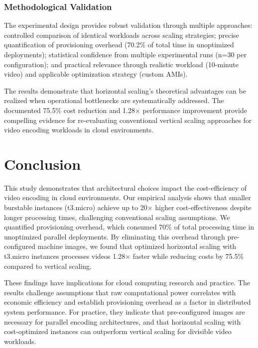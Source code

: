 \documentclass[conference]{IEEEtran}
\begin{document}
	\subsubsection{Methodological Validation}
	
	The experimental design provides robust validation through multiple approaches: controlled comparison of identical workloads across scaling strategies; precise quantification of provisioning overhead (70.2\% of total time in unoptimized deployments); statistical confidence from multiple experimental runs (n=30 per configuration); and practical relevance through realistic workload (10-minute video) and applicable optimization strategy (custom AMIs).
	
	The results demonstrate that horizontal scaling's theoretical advantages can be realized when operational bottlenecks are systematically addressed. The documented 75.5\% cost reduction and 1.28× performance improvement provide compelling evidence for re-evaluating conventional vertical scaling approaches for video encoding workloads in cloud environments.
	
	
	
	
	
	
	
	
	
	
	
	
	
	
	
	
	
	
	\section{Conclusion}
	\label{conclusion}
	
	This study demonstrates that architectural choices impact the cost-efficiency of video encoding in cloud environments. Our empirical analysis shows that smaller burstable instances (t3.micro) achieve up to 20× higher cost-effectiveness despite longer processing times, challenging conventional scaling assumptions. We quantified provisioning overhead, which consumed 70\% of total processing time in unoptimized parallel deployments. By eliminating this overhead through pre-configured machine images, we found that optimized horizontal scaling with t3.micro instances processes videos 1.28× faster while reducing costs by 75.5\% compared to vertical scaling.
	
	These findings have implications for cloud computing research and practice. The results challenge assumptions that raw computational power correlates with economic efficiency and establish provisioning overhead as a factor in distributed system performance. For practice, they indicate that pre-configured images are necessary for parallel encoding architectures, and that horizontal scaling with cost-optimized instances can outperform vertical scaling for divisible video workloads.
	
\end{document}
